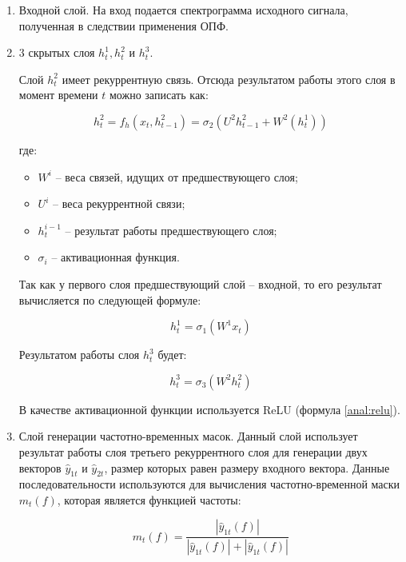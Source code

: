 \begin{enumerate}
	\item Входной слой. На вход подается спектрограмма исходного сигнала, полученная в следствии применения ОПФ.
	\item 3 скрытых слоя $h_t^1, h_t^2$ и $h_t^3$. 
	
	Слой $h_t^2$ имеет рекуррентную связь. Отсюда результатом работы этого слоя в момент времени $t$ можно записать как:
	
	\begin{equation}
	h_t^2 = f_h(x_t, h_{t-1}^2) = \sigma_2 (U^2 h_{t-1}^2 + W^2(h_{t}^1))
	\end{equation}
	
	где:
	
	\begin{itemize}
		\item $W^i$ -- веса связей, идущих от предшествующего слоя;
		\item $U^i$ -- веса рекуррентной связи;
		\item $h_t^{i-1}$ -- результат работы предшествующего слоя;
		\item $\sigma_i$ -- активационная функция.
	\end{itemize}

	Так как у первого слоя предшествующий слой -- входной, то его результат вычисляется по следующей формуле:
	
	\begin{equation}
	h_t^1 = \sigma_1 ( W^1 x_t)
	\end{equation}
	
	Результатом работы слоя $h_t^3$ будет:
	
	\begin{equation}
	h_t^3 = \sigma_3 (W^2 h_t^2)
	\end{equation}
	
	В качестве активационной функции используется ReLU (формула \ref{anal:relu}).
	
	\item Слой генерации частотно-временных масок. Данный слой использует результат работы слоя третьего рекуррентного слоя для генерации двух векторов $\hat{y}_{1t}$ и $\hat{y}_{2t}$, размер которых равен размеру входного вектора. Данные последовательности используются для вычисления частотно-временной маски $m_t(f)$, которая является функцией частоты:
	
	\begin{equation}
	m_t(f) = \frac{|\hat{y}_{1t}(f)|}{|\hat{y}_{1t}(f)| + |\hat{y}_{1t}(f)|}
	\label{des:mask}
	\end{equation}
	

\end{enumerate}
